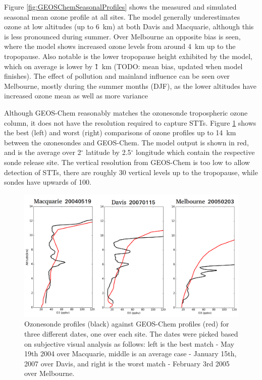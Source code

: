 \documentclass{article}
\begin{document}
  Figure \ref{fig:GEOSChemSeasonalProfiles} shows the measured and simulated seasonal mean ozone profile at all sites.
  The model generally underestimates ozone at low altitudes (up to 6~km) at both Davis and Macquarie, although this is less pronounced during summer.
  Over Melbourne an opposite bias is seen, where the model shows increased ozone levels from around 4~km up to the tropopause.
  Also notable is the lower tropopause height exhibited by the model, which on average is lower by \~1~km (TODO: mean bias, updated when model finishes).
  The effect of pollution and mainland influence can be seen over Melbourne, mostly during the summer months (DJF), as the lower altitudes have increased ozone mean as well as more variance
  
  Although GEOS-Chem reasonably matches the ozonesonde tropospheric ozone column, it does not have the resolution required to capture STTs.
  Figure \ref{fig:event_profile_comparison} shows the best (left) and worst (right) comparisons of ozone profiles up to 14~km between the ozonesondes and GEOS-Chem.
  The model output is shown in red, and is the average over 2$^{\circ}$ latitude by 2.5$^{\circ}$ longitude which contain the respective sonde release site.
  The vertical resolution from GEOS-Chem is too low to allow detection of STTs, there are roughly 30 vertical levels up to the tropopause, while sondes have upwards of 100.
  
  \begin{figure}[!htbp]
    \includegraphics[width=\textwidth]{figures/event_profile_comparison.png}
    \caption{Ozonesonde profiles (black) against GEOS-Chem profiles (red) for three different dates, one over each site.
    The dates were picked based on subjective visual analysis as follows: left is the best match - May 19th 2004 over Macquarie, middle is an average case - January 15th, 2007 over Davis, and right is the worst match - February 3rd 2005 over Melbourne.}
    \label{fig:event_profile_comparison}
  \end{figure}
  
\end{document}
